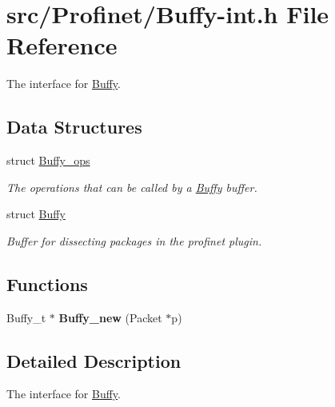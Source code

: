 \hypertarget{_buffy-int_8h}{}\section{src/\+Profinet/\+Buffy-\/int.h File Reference}
\label{_buffy-int_8h}


The interface for \hyperlink{struct_buffy}{Buffy}.  


\subsection*{Data Structures}
\begin{DoxyCompactItemize}
\item 
struct \hyperlink{struct_buffy__ops}{Buffy\+\_\+ops}
\begin{DoxyCompactList}\small\item\em The operations that can be called by a \hyperlink{struct_buffy}{Buffy} buffer. \end{DoxyCompactList}\item 
struct \hyperlink{struct_buffy}{Buffy}
\begin{DoxyCompactList}\small\item\em Buffer for dissecting packages in the profinet plugin. \end{DoxyCompactList}\end{DoxyCompactItemize}
\subsection*{Functions}
\begin{DoxyCompactItemize}
\item 
\hypertarget{_buffy-int_8h_a1274babfe9f124dab45c870ac6630496}{}Buffy\+\_\+t $\ast$ {\bfseries Buffy\+\_\+new} (Packet $\ast$p)\label{_buffy-int_8h_a1274babfe9f124dab45c870ac6630496}

\end{DoxyCompactItemize}


\subsection{Detailed Description}
The interface for \hyperlink{struct_buffy}{Buffy}. 

